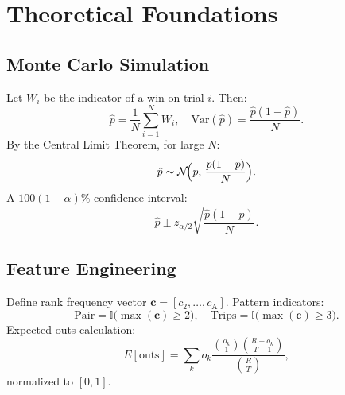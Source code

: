 \section{Theoretical Foundations}

\subsection{Monte Carlo Simulation}
Let $W_i$ be the indicator of a win on trial $i$. Then:
\[
\hat{p} = \frac{1}{N} \sum_{i=1}^N W_i, 
\quad \mathrm{Var}(\hat{p}) = \frac{\hat{p}(1-\hat{p})}{N}.
\]
By the Central Limit Theorem, for large $N$:
\[
\hat{p} \sim \mathcal{N}\!\Bigl(p,\,\frac{p(1-p)}{N}\Bigr).
\]
A $100(1-\alpha)\%$ confidence interval:
\[
\hat{p} \pm z_{\alpha/2}\sqrt{\frac{\hat{p}(1-\hat{p})}{N}}.
\]

\subsection{Feature Engineering}
Define rank frequency vector $\mathbf{c} = [c_2,\dots,c_{\mathrm{A}}]$. Pattern indicators:
\[
\text{Pair} = \mathbb{I}\bigl(\max(\mathbf{c})\ge2\bigr),\quad
\text{Trips} = \mathbb{I}\bigl(\max(\mathbf{c})\ge3\bigr).
\]
Expected outs calculation:
\[
E[\text{outs}] = \sum_k o_k \frac{\binom{o_k}{1}\binom{R - o_k}{T-1}}{\binom{R}{T}},
\]
normalized to $[0,1]$.
